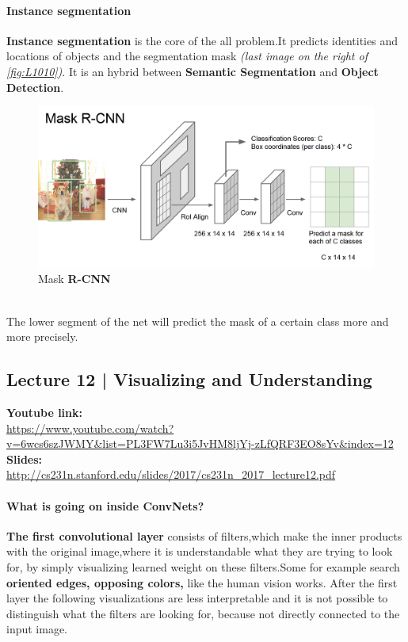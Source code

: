 \documentclass[11pt]{article}
\begin{document}
\paragraph{Instance segmentation}
\textbf{Instance segmentation} is the core of the all problem.It predicts identities and locations of objects and the segmentation mask \textit{(last image on the right of \ref{fig:L1010})}. It is an hybrid between \textbf{Semantic Segmentation} and \textbf{Object Detection}.
\begin{figure}[h]
\centering
\captionsetup{justification=centering}
\includegraphics[width=0.9\linewidth]{L1020.pdf}
\caption{Mask \textbf{R-CNN} }
\label{fig:L1020}
\end{figure}\\
The lower segment of the net will predict the mask of a certain class more and more precisely.

\clearpage
\subsection{Lecture 12 | Visualizing and Understanding}
\textbf{Youtube link:}\\
\url{https://www.youtube.com/watch?v=6wcs6szJWMY&list=PL3FW7Lu3i5JvHM8ljYj-zLfQRF3EO8sYv&index=12}\\
\textbf{Slides:}\\
\url{http://cs231n.stanford.edu/slides/2017/cs231n_2017_lecture12.pdf}
\paragraph{What is going on inside ConvNets?}
\textbf{The first convolutional layer} consists of filters,which make the inner products with the original image,where it is understandable what they are trying to look for, by simply visualizing learned weight on these filters.Some for example search \textbf{oriented edges,  opposing colors,} like the human vision works.
After the first layer the following visualizations are less interpretable and it is not possible to distinguish what the filters are looking for, because not directly connected to the input image.
\end{document}
